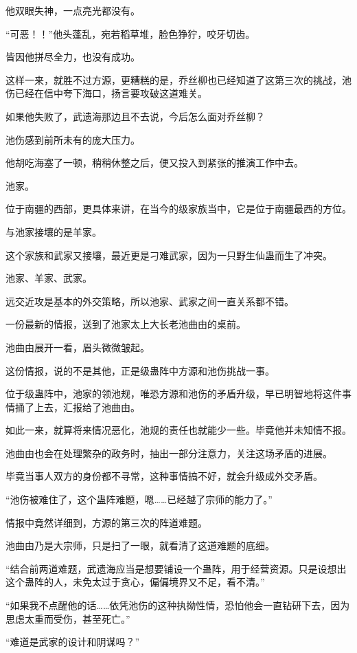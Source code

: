 \begin{this_body}
他双眼失神，一点亮光都没有。

“可恶！！”他头蓬乱，宛若稻草堆，脸色狰狞，咬牙切齿。

皆因他拼尽全力，也没有成功。

这样一来，就胜不过方源，更糟糕的是，乔丝柳也已经知道了这第三次的挑战，池伤已经在信中夸下海口，扬言要攻破这道难关。

如果他失败了，武遗海那边且不去说，今后怎么面对乔丝柳？

池伤感到前所未有的庞大压力。

他胡吃海塞了一顿，稍稍休整之后，便又投入到紧张的推演工作中去。

池家。

位于南疆的西部，更具体来讲，在当今的级家族当中，它是位于南疆最西的方位。

与池家接壤的是羊家。

这个家族和武家又接壤，最近更是刁难武家，因为一只野生仙蛊而生了冲突。

池家、羊家、武家。

远交近攻是基本的外交策略，所以池家、武家之间一直关系都不错。

一份最新的情报，送到了池家太上大长老池曲由的桌前。

池曲由展开一看，眉头微微皱起。

这份情报，说的不是其他，正是级蛊阵中方源和池伤挑战一事。

位于级蛊阵中，池家的领池规，唯恐方源和池伤的矛盾升级，早已明智地将这件事情捅了上去，汇报给了池曲由。

如此一来，就算将来情况恶化，池规的责任也就能少一些。毕竟他并未知情不报。

池曲由也会在处理繁杂的政务时，抽出一部分注意力，关注这场矛盾的进展。

毕竟当事人双方的身份都不寻常，这种事情搞不好，就会升级成外交矛盾。

“池伤被难住了，这个蛊阵难题，嗯……已经越了宗师的能力了。”

情报中竟然详细到，方源的第三次的阵道难题。

池曲由乃是大宗师，只是扫了一眼，就看清了这道难题的底细。

“结合前两道难题，武遗海应当是想要铺设一个蛊阵，用于经营资源。只是设想出这个蛊阵的人，未免太过于贪心，偏偏境界又不足，看不清。”

“如果我不点醒他的话……依凭池伤的这种执拗性情，恐怕他会一直钻研下去，因为思虑太重而受伤，甚至死亡。”

“难道是武家的设计和阴谋吗？”


\end{this_body}
